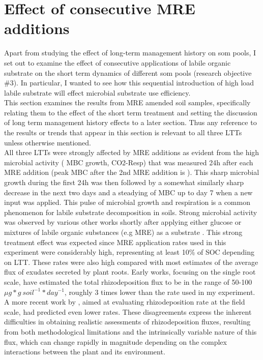 \section{Effect of consecutive MRE additions}
Apart from studying the effect of long-term management history on \gls{som} pools, I set out to examine the effect of consecutive applications of labile organic substrate on the short term dynamics of different \gls{som} pools (research objective \#3). In particular, I wanted to see how this sequential introduction of high load labile substrate will effect microbial substrate use efficiency.\\
This section examines the results from MRE amended soil samples, specifically relating them to the effect of the short term treatment and setting the discussion of long term management history effects to a later section. Thus any reference to the results or trends that appear in this section is relevant to all three LTTs unless otherwise mentioned.\\
All three LTTs were strongly affected by MRE additions as evident from the high microbial activity ( MBC growth, CO2-Resp) that was measured 24h after each MRE addition (peak MBC after the 2nd MRE addition is  ). This sharp microbial growth during the first 24h was then followed by a somewhat similarly sharp decrease  in the next two days and a steadying of MBC up to day 7 when a new input was applied. This pulse of microbial growth and respiration is a common phenomenon for labile substrate decomposition in soils.
Strong microbial activity was  observed by various other works shortly after applying either glucose or mixtures of labile organic substances (e.g MRE) as a substrate \citep{hill2008, landi2006, traore2000}.
This strong treatment effect was expected since MRE application rates used in this experiment were considerably high, representing at least 10\% of SOC depending on LTT. These rates were also high compared with most estimates of the average flux of exudates secreted by plant roots. Early works, focusing on the single root scale, have estimated the total rhizodeposition flux to be in the range of 50-100 $ \mu g * g\ soil^{-1} * day^{-1} $, roughly 3 times lower than the rate used in my experiment. A more recent work by \citet{pausch2018}, aimed at evaluating rhizodeposition rate at the field scale, had predicted even lower rates. These disagreements express the inherent difficulties in obtaining realistic assessments of rhizodeposition fluxes, resulting from both methodological limitations and the intrinsically variable nature of this flux, which can change rapidly in magnitude depending  on the complex interactions between the plant and its environment.

